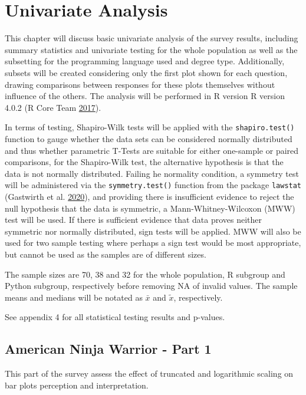 \documentclass[
  11pt,
]{book}
\begin{document}
\chapter{Univariate Analysis}

This chapter will discuss basic univariate analysis of the survey
results, including summary statistics and univariate testing for the
whole population as well as the subsetting for the programming language
used and degree type. Additionally, subsets will be created considering
only the first plot shown for each question, drawing comparisons between
responses for these plots themselves without influence of the others.
The analysis will be performed in R version R version 4.0.2 (R Core Team
\protect\hyperlink{ref-R}{2017}).

In terms of testing, Shapiro-Wilk tests will be applied with the
\texttt{shapiro.test()} function to gauge whether the data sets can be
considered normally distributed and thus whether parametric T-Tests are
suitable for either one-sample or paired comparisons, for the
Shapiro-Wilk test, the alternative hypothesis is that the data is not
normally distributed. Failing he normality condition, a symmetry test
will be administered via the \texttt{symmetry.test()} function from the
package \texttt{lawstat} (Gastwirth et al.
\protect\hyperlink{ref-lawstat}{2020}), and providing there is
insufficient evidence to reject the null hypothesis that the data is
symmetric, a Mann-Whitney-Wilcoxon (MWW) test will be used. If there is
sufficient evidence that data proves neither symmetric nor normally
distributed, sign tests will be applied. MWW will also be used for two
sample testing where perhaps a sign test would be most appropriate, but
cannot be used as the samples are of different sizes.

The sample sizes are 70, 38 and 32 for the whole population, R subgroup
and Python subgroup, respectively before removing NA of invalid values.
The sample means and medians will be notated as \(\bar{x}\) and
\(\tilde{x}\), respectively.

See appendix 4 for all statistical testing results and p-values.

\section{American Ninja Warrior - Part 1}

This part of the survey assess the effect of truncated and logarithmic
scaling on bar plots perception and interpretation.
\end{document}
